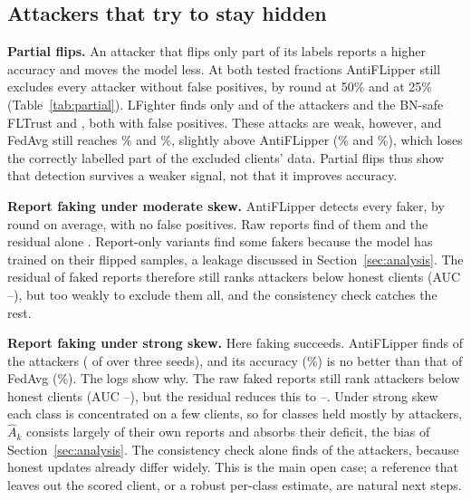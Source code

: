\documentclass[conference]{IEEEtran}
\begin{document}
\subsection{Attackers that try to stay hidden}
\label{sec:hidden}


\textbf{Partial flips.} An attacker that flips only part of its labels reports a higher accuracy and moves the model less. At both tested fractions AntiFLipper still excludes every attacker without false positives, by round \pfDetHalf{} at 50\% and \pfDetQuarter{} at 25\% (Table~\ref{tab:partial}). LFighter finds only \pfRecLFighterHalf{} and \pfRecLFighterQuarter{} of the attackers and the BN-safe FLTrust \pfRecFLTrustHalf{} and \pfRecFLTrustQuarter, both with false positives. These attacks are weak, however, and FedAvg still reaches \pfAccFedAvgHalf\% and \pfAccFedAvgQuarter\%, slightly above AntiFLipper (\pfAccHalf\% and \pfAccQuarter\%), which loses the correctly labelled part of the excluded clients' data. Partial flips thus show that detection survives a weaker signal, not that it improves accuracy.

\textbf{Report faking under moderate skew.} AntiFLipper detects every faker, by round \fakeDet{} on average, with no false positives. Raw reports find \fakeRecallRaw{} of them and the residual alone \fakeRecallCROnly. Report-only variants find some fakers because the model has trained on their flipped samples, a leakage discussed in Section~\ref{sec:analysis}. The residual of faked reports therefore still ranks attackers below honest clients (AUC \fakeAucResHighMin--\fakeAucResHighMax), but too weakly to exclude them all, and the consistency check catches the rest.

\textbf{Report faking under strong skew.} Here faking succeeds. AntiFLipper finds \fsRecall{} of the attackers (\fsFound{} of \fsTotal{} over three seeds), and its accuracy (\fsAcc\%) is no better than that of FedAvg (\fsAccFedAvg\%). The logs show why. The raw faked reports still rank attackers below honest clients (AUC \fakeAucRawLowMin--\fakeAucRawLowMax), but the residual reduces this to \fakeAucResLowMin--\fakeAucResLowMax. Under strong skew each class is concentrated on a few clients, so for classes held mostly by attackers, $\hat A_k$ consists largely of their own reports and absorbs their deficit, the bias of Section~\ref{sec:analysis}. The consistency check alone finds \ccSkewRecall{} of the attackers, because honest updates already differ widely. This is the main open case; a reference that leaves out the scored client, or a robust per-class estimate, are natural next steps.
\end{document}
